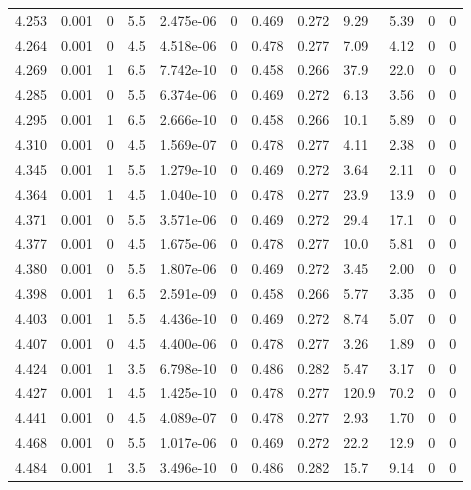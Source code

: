 \documentclass[preview]{standalone}
\begin{document}
{{{{{{{{\begin{tabular}{L{1.2cm}C{1.2cm} C{0.3cm}C{0.5cm} C{1.4cm}C{1.4cm} C{1.4cm}C{1.4cm} C{1.6cm}C{1.6cm} C{1.6cm}C{1.6cm}}
  4.253  &  0.001  & 0     & 5.5 &  2.475e-06  & 0  &  0.469&   0.272& 9.29 & 5.39   &  0 & 0  \\ 
  4.264  &  0.001  & 0     & 4.5 &  4.518e-06  & 0  &  0.478&   0.277& 7.09 & 4.12   &  0 & 0  \\ 
  4.269  &  0.001  & 1     & 6.5 &  7.742e-10  & 0  &  0.458&   0.266& 37.9 & 22.0   &  0 & 0  \\ 
  4.285  &  0.001  & 0     & 5.5 &  6.374e-06  & 0  &  0.469&   0.272& 6.13 & 3.56   &  0 & 0  \\ 
  4.295  &  0.001  & 1     & 6.5 &  2.666e-10  & 0  &  0.458&   0.266& 10.1 & 5.89   &  0 & 0  \\ 
  4.310  &  0.001  & 0     & 4.5 &  1.569e-07  & 0  &  0.478&   0.277& 4.11 & 2.38   &  0 & 0  \\ 
  4.345  &  0.001  & 1     & 5.5 &  1.279e-10  & 0  &  0.469&   0.272& 3.64 & 2.11   &  0 & 0  \\ 
  4.364  &  0.001  & 1     & 4.5 &  1.040e-10  & 0  &  0.478&   0.277& 23.9 & 13.9   &  0 & 0  \\ 
  4.371  &  0.001  & 0     & 5.5 &  3.571e-06  & 0  &  0.469&   0.272& 29.4 & 17.1   &  0 & 0  \\ 
  4.377  &  0.001  & 0     & 4.5 &  1.675e-06  & 0  &  0.478&   0.277& 10.0 & 5.81   &  0 & 0  \\ 
  4.380  &  0.001  & 0     & 5.5 &  1.807e-06  & 0  &  0.469&   0.272& 3.45 & 2.00   &  0 & 0  \\ 
  4.398  &  0.001  & 1     & 6.5 &  2.591e-09  & 0  &  0.458&   0.266& 5.77 & 3.35   &  0 & 0  \\ 
  4.403  &  0.001  & 1     & 5.5 &  4.436e-10  & 0  &  0.469&   0.272& 8.74 & 5.07   &  0 & 0  \\ 
  4.407  &  0.001  & 0     & 4.5 &  4.400e-06  & 0  &  0.478&   0.277& 3.26 & 1.89   &  0 & 0  \\ 
  4.424  &  0.001  & 1     & 3.5 &  6.798e-10  & 0  &  0.486&   0.282& 5.47 & 3.17   &  0 & 0  \\ 
  4.427  &  0.001  & 1     & 4.5 &  1.425e-10  & 0  &  0.478&   0.277& 120.9 & 70.2   &  0 & 0  \\ 
  4.441  &  0.001  & 0     & 4.5 &  4.089e-07  & 0  &  0.478&   0.277& 2.93 & 1.70   &  0 & 0  \\ 
  4.468  &  0.001  & 0     & 5.5 &  1.017e-06  & 0  &  0.469&   0.272& 22.2 & 12.9   &  0 & 0  \\ 
  4.484  &  0.001  & 1     & 3.5 &  3.496e-10  & 0  &  0.486&   0.282& 15.7 & 9.14   &  0 & 0  \\ 

\end{tabular}}}}}}}}}
\end{document}
